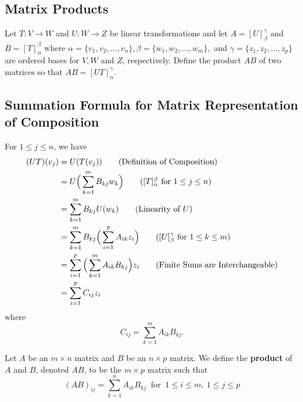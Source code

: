 \subsection{Matrix Products}

\begin{definition}
    Let \( T: V \to W  \) and \( U: W \to Z  \) be linear transformations and let \( A = [U]_{\beta}^{\gamma}  \) and \( B = [T]_{\alpha}^{\beta}  \) where \( \alpha = \{ {v}_{1}, {v}_{2}, \dots, {v}_{n}  \}, \beta = \{ {w}_{1}, {w}_{2}, \dots, {w}_{m} \},   \) and \( \gamma = \{ {z}_{1}, {z}_{2}, \dots,  {z}_{p} \}  \) are ordered bases for \( V, W  \) and \( Z  \), respectively. Define the product \( AB \) of two matrices so that \( AB = [UT]_{\alpha}^{\gamma}  \). 
\end{definition}

\subsection{Summation Formula for Matrix Representation of Composition}
For \( 1 \leq j \leq n \), we have
\begin{align*}
    (UT)({v}_{j}) &= U(T({v}_{j})) \tag{Definition of Composition} \\
              &= U \Big( \sum_{ k=1 }^{ m } {B}_{kj} {w}_{k } \Big) \tag{\( [T]_{\alpha}^{\beta}\) for \( 1 \leq j \leq n  \)} \\
              &= \sum_{ k=1 }^{ m } {B}_{kj} U({w}_{k }) \tag{Linearity of \( U \)}  \\
              &= \sum_{ k=1 }^{ m } {B}_{k j} \Big( \sum_{ i=1 }^{ p } {A}_{i k } {z}_{i} \Big) \tag{\( [U]_{\beta}^{\gamma}  \) for \( 1 \leq k \leq m  \)} \\  
              &= \sum_{ i=1 }^{ p  } \Big( \sum_{ k=1 }^{ m } {A}_{ik } {B}_{kj} \Big) {z}_{i} \tag{Finite Sums are Interchangeable} \\
              &= \sum_{ i=1  }^{ p } {C}_{ij} {z}_{i}
\end{align*}
where 
\[  {C}_{ij} = \sum_{ k=1 }^{ m } {A}_{ik } {B}_{kj}. \]

\begin{definition}
    Let \( A  \) be an \( m \times n  \) matrix and \( B  \) be an \( n \times p  \) matrix. We define the \textbf{product} of \( A  \) and \( B  \), denoted \( AB  \), to be the \( m \times p  \) matrix such that 
    \[  {(AB)}_{ij} = \sum_{ k=1 }^{ n } {A}_{ik } {B}_{kj } \ \text{ for } \ 1 \leq i \leq m , \  1 \leq j \leq p   \]
\end{definition}
